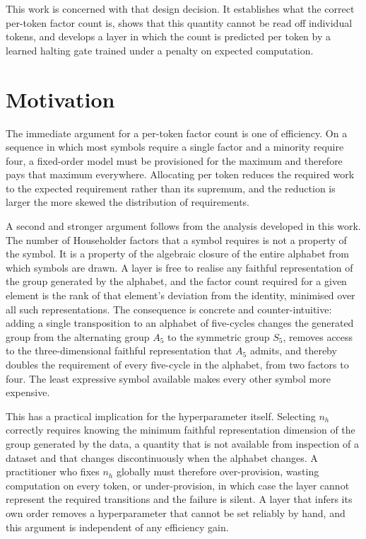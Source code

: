 This work is concerned with that design decision. It establishes what the correct
per-token factor count is, shows that this quantity cannot be read off individual
tokens, and develops a layer in which the count is predicted per token by a
learned halting gate trained under a penalty on expected computation.

\section{Motivation}

The immediate argument for a per-token factor count is one of efficiency. On a
sequence in which most symbols require a single factor and a minority require
four, a fixed-order model must be provisioned for the maximum and therefore pays
that maximum everywhere. Allocating per token reduces the required work to the
expected requirement rather than its supremum, and the reduction is larger the
more skewed the distribution of requirements.

A second and stronger argument follows from the analysis developed in this work.
The number of Householder factors that a symbol requires is not a property of the
symbol. It is a property of the algebraic closure of the entire alphabet from
which symbols are drawn. A layer is free to realise any faithful representation
of the group generated by the alphabet, and the factor count required for a given
element is the rank of that element's deviation from the identity, minimised over
all such representations. The consequence is concrete and counter-intuitive:
adding a single transposition to an alphabet of five-cycles changes the generated
group from the alternating group $A_5$ to the symmetric group $S_5$, removes
access to the three-dimensional faithful representation that $A_5$ admits, and
thereby doubles the requirement of every five-cycle in the alphabet, from two
factors to four. The least expressive symbol available makes every other symbol
more expensive.

This has a practical implication for the hyperparameter itself. Selecting $n_h$
correctly requires knowing the minimum faithful representation dimension of the
group generated by the data, a quantity that is not available from inspection of
a dataset and that changes discontinuously when the alphabet changes. A
practitioner who fixes $n_h$ globally must therefore over-provision, wasting
computation on every token, or under-provision, in which case the layer cannot
represent the required transitions and the failure is silent. A layer that infers
its own order removes a hyperparameter that cannot be set reliably by hand, and
this argument is independent of any efficiency gain.

